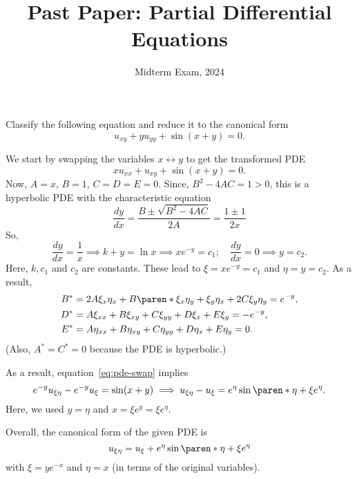 \documentclass[11pt]{penrose}
\title{Past Paper: Partial Differential Equations}
\subtitle{Midterm Exam, 2024}
\begin{document}
\maketitle
\warningtext

\begin{problem}{1}
    Classify the following equation and reduce it to the canonical form
    \begin{equation*}
        u_{xy} + y u_{yy} + \sin(x+y) = 0.
    \end{equation*}

    \solution We start by swapping the variables $x \leftrightarrow y$ to get the transformed PDE
    \begin{equation*}
        x u_{xx} + u_{xy} + \sin(x+y) = 0. \tag{\textasteriskcentered}\label{eq:pde-swap}
    \end{equation*}
    Now, $A = x$, $B = 1$, $C = D = E = 0$. Since, $B^2 - 4AC = 1 > 0$, this is a hyperbolic PDE with the characteristic equation
    \begin{equation*}
        \frac{dy}{dx} = \frac{B \pm \sqrt{B^2 - 4AC}}{2A} = \frac{1 \pm 1}{2x}
    \end{equation*}
    So,
    \begin{equation*}
        \frac{dy}{dx} = \frac{1}{x} \implies k + y = \ln x \implies x e^{-y} = c_1; \quad
        \frac{dy}{dx} = 0 \implies y = c_2.
    \end{equation*}
    Here, $k, c_1$ and $c_2$ are constants. These lead to $\xi = x e^{-y} = c_1$ and $\eta = y = c_2$. As a result,
    \begin{align*}
        B^{*} &= 2A\xi_x \eta_x + B \paren*{\xi_x \eta_y + \xi_y \eta_x} + 2C \xi_y \eta_y = e^{-y},\\
        D^{*} &= A \xi_{xx} + B \xi_{xy} + C \xi_{yy} + D \xi_{x} + E \xi_{y} = -e^{-y},\\
        E^{*} &= A \eta_{xx} + B \eta_{xy} + C \eta_{yy} + D \eta_{x} + E \eta_{y} = 0.
    \end{align*}
    (Also, $A^{*} = C^{*} = 0$ because the PDE is hyperbolic.)

    As a result, equation~\eqref{eq:pde-swap} implies
    \begin{equation*}
        e^{-y} u_{\xi\eta} - e^{-y} u_{\xi} = \sin(x + y)
        \implies u_{\xi\eta} - u_{\xi} = e^{\eta}\sin\paren*{\eta + \xi e^\eta}.
    \end{equation*}
    Here, we used $y = \eta$ and $x = \xi e^y = \xi e^\eta$.

    Overall, the canonical form of the given PDE is
    \begin{equation*}
        u_{\xi\eta} = u_{\xi} + e^{\eta}\sin\paren*{\eta + \xi e^\eta}
    \end{equation*}
    with $\xi = y e^{-x}$ and $\eta = x$ (in terms of the original variables).
\end{problem}
\end{document}
